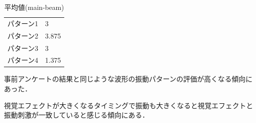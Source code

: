   \begin{table}[H]
    \caption{平均値(main-beam)}
    \centering
    \begin{tabular}{l|l}
    \hline
    \hline
    パターン1 & 3\\
    パターン2 & 3.875\\
    パターン3 & 3\\
    パターン4 & 1.375\\
    \hline
    \end{tabular}
    \label{tab;mainAve}
\end{table}

事前アンケートの結果と同じような波形の振動パターンの評価が高くなる傾向にあった．

視覚エフェクトが大きくなるタイミングで振動も大きくなると視覚エフェクトと振動刺激が一致していると感じる傾向にある．


